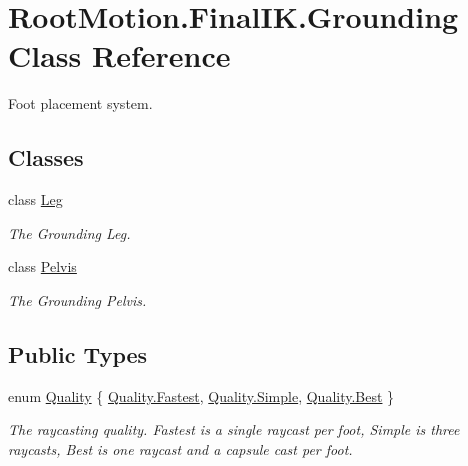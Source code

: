 \hypertarget{class_root_motion_1_1_final_i_k_1_1_grounding}{}\section{Root\+Motion.\+Final\+I\+K.\+Grounding Class Reference}
\label{class_root_motion_1_1_final_i_k_1_1_grounding}


Foot placement system.  


\subsection*{Classes}
\begin{DoxyCompactItemize}
\item 
class \mbox{\hyperlink{class_root_motion_1_1_final_i_k_1_1_grounding_1_1_leg}{Leg}}
\begin{DoxyCompactList}\small\item\em The Grounding Leg. \end{DoxyCompactList}\item 
class \mbox{\hyperlink{class_root_motion_1_1_final_i_k_1_1_grounding_1_1_pelvis}{Pelvis}}
\begin{DoxyCompactList}\small\item\em The Grounding Pelvis. \end{DoxyCompactList}\end{DoxyCompactItemize}
\subsection*{Public Types}
\begin{DoxyCompactItemize}
\item 
enum \mbox{\hyperlink{class_root_motion_1_1_final_i_k_1_1_grounding_ad216a50d7c69e8851cba32c52db05bf0}{Quality}} \{ \mbox{\hyperlink{class_root_motion_1_1_final_i_k_1_1_grounding_ad216a50d7c69e8851cba32c52db05bf0a90fd7fdf6f41406a75e5265b9583bb4e}{Quality.\+Fastest}}, 
\mbox{\hyperlink{class_root_motion_1_1_final_i_k_1_1_grounding_ad216a50d7c69e8851cba32c52db05bf0a1fbb1e3943c2c6c560247ac8f9289780}{Quality.\+Simple}}, 
\mbox{\hyperlink{class_root_motion_1_1_final_i_k_1_1_grounding_ad216a50d7c69e8851cba32c52db05bf0a68ef004de6166492c1d668eb8efe09bd}{Quality.\+Best}}
 \}
\begin{DoxyCompactList}\small\item\em The raycasting quality. Fastest is a single raycast per foot, Simple is three raycasts, Best is one raycast and a capsule cast per foot. \end{DoxyCompactList}\end{DoxyCompactItemize}
